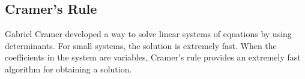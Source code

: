 \documentclass[letterpaper,oneside]{book}%
\theoremstyle{plain}
\theoremstyle{box}
\theoremstyle{problem}
\newcommand{\bvec}[1]{\begin{bmatrix} #1 \end{bmatrix}}
\begin{document}
%  
% 
%  



\subsection*{Cramer's Rule}
Gabriel Cramer developed a way to solve linear systems of equations by using determinants. For small systems, the solution is extremely fast. When the coefficients in the system are variables, Cramer's rule provides an extremely fast algorithm for obtaining a solution.
\end{document}
